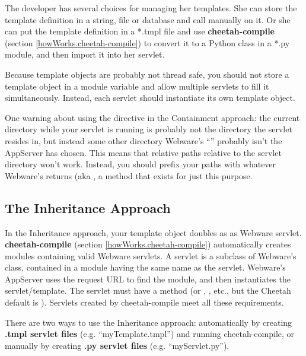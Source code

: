 The developer has several choices for managing her templates.  She can store the
template definition in a string, file or database and call
 manually on it.  Or she can put the
template definition in a *.tmpl file and use {\bf cheetah-compile} (section
\ref{howWorks.cheetah-compile}) to convert it to a Python class in a *.py
module, and then import it into her servlet.

Because template objects are probably not thread safe, you should not store a
template object in a module variable and allow multiple servlets to fill it
simultaneously.  Instead, each servlet should instantiate its own template
object.

One warning about using the  directive in the Containment
approach: the current directory while your servlet is running is probably not
the directory the servlet resides in, but instead some other directory
Webware's ``'' probably isn't the AppServer has
chosen.  This means that relative paths relative to the servlet directory
won't work.  Instead, you should prefix your paths with whatever Webware's
 returns (aka , a
method that exists for just this purpose.



\subsection{The Inheritance Approach}
\label{webware.inheritance}

In the Inheritance approach, your template object doubles as as Webware 
servlet.  {\bf cheetah-compile} (section \ref{howWorks.cheetah-compile}) 
automatically creates modules containing valid Webware servlets.  A servlet is
a subclass of Webware's  class, contained in a module
having the same name as the servlet.  Webware's AppServer uses the request URL
to find the module, and then instantiates the servlet/template.  The servlet
must have a  method (or ,
, etc., but the Cheetah default is ).
Servlets created by cheetah-compile meet all these requirements.

There are two ways to use the Inheritance approach: automatically by creating
{\bf *.tmpl servlet files} (e.g. ``myTemplate.tmpl'') and running
cheetah-compile, or manually by creating {\bf .py servlet files} (e.g.
``myServlet.py'').

